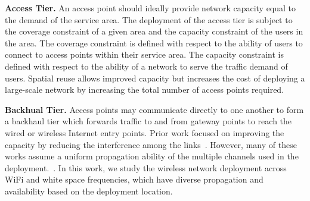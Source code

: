 \textbf{Access Tier.} 
An access point should ideally provide network capacity equal to the demand of the service 
area. The deployment of the access tier is subject to the coverage constraint of a given area and the capacity 
constraint of the users in the area. The coverage constraint is defined with respect to the ability of 
users to connect to access points within their service area. The capacity constraint is defined with 
respect to the ability of a network to serve the traffic demand of users. Spatial reuse allows improved 
capacity but increases the cost of deploying a large-scale network by increasing the total number of access points 
required. 

\textbf{Backhual Tier.} 
Access points may communicate directly to one another to form a backhaul tier which forwards traffic to and from 
gateway points to reach the wired or wireless Internet entry points. 
Prior work focused on improving the capacity 
by reducing the interference among the links~\cite{si2010overview,doraghinejad2014channel}. 
However, many of these works assume a uniform propagation ability of the multiple channels used in the deployment.~\cite{doraghinejad2014channel}. 
In this work, we study the wireless network deployment across WiFi and white space frequencies, which have diverse 
propagation and availability based on the deployment location.





 








